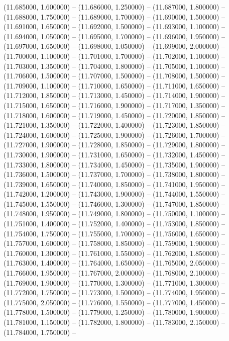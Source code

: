 (11.685000, 1.600000) -- 
(11.686000, 1.250000) -- 
(11.687000, 1.800000) -- 
(11.688000, 1.750000) -- 
(11.689000, 1.700000) -- 
(11.690000, 1.500000) -- 
(11.691000, 1.650000) -- 
(11.692000, 1.500000) -- 
(11.693000, 1.100000) -- 
(11.694000, 1.050000) -- 
(11.695000, 1.700000) -- 
(11.696000, 1.950000) -- 
(11.697000, 1.650000) -- 
(11.698000, 1.050000) -- 
(11.699000, 2.000000) -- 
(11.700000, 1.100000) -- 
(11.701000, 1.700000) -- 
(11.702000, 1.100000) -- 
(11.703000, 1.350000) -- 
(11.704000, 1.800000) -- 
(11.705000, 1.100000) -- 
(11.706000, 1.500000) -- 
(11.707000, 1.500000) -- 
(11.708000, 1.500000) -- 
(11.709000, 1.100000) -- 
(11.710000, 1.650000) -- 
(11.711000, 1.650000) -- 
(11.712000, 1.850000) -- 
(11.713000, 1.450000) -- 
(11.714000, 1.900000) -- 
(11.715000, 1.650000) -- 
(11.716000, 1.900000) -- 
(11.717000, 1.350000) -- 
(11.718000, 1.600000) -- 
(11.719000, 1.450000) -- 
(11.720000, 1.850000) -- 
(11.721000, 1.350000) -- 
(11.722000, 1.400000) -- 
(11.723000, 1.850000) -- 
(11.724000, 1.600000) -- 
(11.725000, 1.900000) -- 
(11.726000, 1.700000) -- 
(11.727000, 1.900000) -- 
(11.728000, 1.850000) -- 
(11.729000, 1.800000) -- 
(11.730000, 1.900000) -- 
(11.731000, 1.650000) -- 
(11.732000, 1.450000) -- 
(11.733000, 1.800000) -- 
(11.734000, 1.450000) -- 
(11.735000, 1.900000) -- 
(11.736000, 1.500000) -- 
(11.737000, 1.700000) -- 
(11.738000, 1.800000) -- 
(11.739000, 1.650000) -- 
(11.740000, 1.850000) -- 
(11.741000, 1.950000) -- 
(11.742000, 1.200000) -- 
(11.743000, 1.900000) -- 
(11.744000, 1.550000) -- 
(11.745000, 1.550000) -- 
(11.746000, 1.300000) -- 
(11.747000, 1.850000) -- 
(11.748000, 1.950000) -- 
(11.749000, 1.800000) -- 
(11.750000, 1.100000) -- 
(11.751000, 1.400000) -- 
(11.752000, 1.400000) -- 
(11.753000, 1.850000) -- 
(11.754000, 1.750000) -- 
(11.755000, 1.700000) -- 
(11.756000, 1.650000) -- 
(11.757000, 1.600000) -- 
(11.758000, 1.850000) -- 
(11.759000, 1.900000) -- 
(11.760000, 1.300000) -- 
(11.761000, 1.550000) -- 
(11.762000, 1.850000) -- 
(11.763000, 1.400000) -- 
(11.764000, 1.650000) -- 
(11.765000, 2.050000) -- 
(11.766000, 1.950000) -- 
(11.767000, 2.000000) -- 
(11.768000, 2.100000) -- 
(11.769000, 1.900000) -- 
(11.770000, 1.300000) -- 
(11.771000, 1.300000) -- 
(11.772000, 1.750000) -- 
(11.773000, 1.500000) -- 
(11.774000, 1.950000) -- 
(11.775000, 2.050000) -- 
(11.776000, 1.550000) -- 
(11.777000, 1.450000) -- 
(11.778000, 1.500000) -- 
(11.779000, 1.250000) -- 
(11.780000, 1.900000) -- 
(11.781000, 1.150000) -- 
(11.782000, 1.800000) -- 
(11.783000, 2.150000) -- 
(11.784000, 1.750000) -- 
